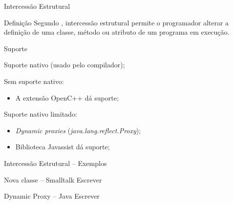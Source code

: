 \documentclass[12pt,t]{beamer}
\begin{document}
 	 \begin{frame}{Intercessão Estrutural}
 	 	\begin{block}{Definição}
 	 		Segundo , intercessão estrutural permite o programador alterar a definição de uma classe, método ou atributo de um programa em execução.
 	 	\end{block} 	 	
 	 	\begin{block}{Suporte}
 	 		\begin{description}[Smalltalk:]
 	 			\item [Smalltalk:] Suporte nativo (usado pelo compilador);
 	 			\item [C++:] Sem suporte nativo:  
 	 				\begin{itemize}
		 	 			\item A extensão OpenC++ \cite{chiba1995metaobject} dá suporte;
		 	 		\end{itemize}
 	 			\item [Java:] Suporte nativo limitado:
	 	 			\begin{itemize}
	 	 				\item \emph{Dynamic proxies} (\emph{java.lang.reflect.Proxy});
	 	 				\item Biblioteca Javassist \cite{chiba2000load} dá suporte;
	 	 			\end{itemize}
 	 		\end{description}
 	 	\end{block}
 	 \end{frame}
 	 \begin{frame}{Intercessão Estrutural -- Exemplos}
 	 	\begin{exampleblock}{Nova classe -- Smalltalk}
 	 		\alert{Escrever}
 	 	\end{exampleblock}
 	 	\begin{exampleblock}{Dynamic Proxy -- Java}
 	 		\alert{Escrever}
 	 	\end{exampleblock}
 	 \end{frame}
\end{document}
